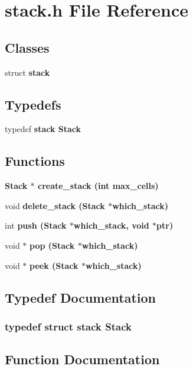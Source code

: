 \section{stack.h File Reference}
\label{stack_8h}
\subsection*{Classes}
\begin{CompactItemize}
\item 
struct \bf{stack}
\end{CompactItemize}
\subsection*{Typedefs}
\begin{CompactItemize}
\item 
typedef \bf{stack} \bf{Stack}
\end{CompactItemize}
\subsection*{Functions}
\begin{CompactItemize}
\item 
\bf{Stack} $\ast$ \bf{create\_\-stack} (int max\_\-cells)
\item 
void \bf{delete\_\-stack} (\bf{Stack} $\ast$which\_\-stack)
\item 
int \bf{push} (\bf{Stack} $\ast$which\_\-stack, void $\ast$ptr)
\item 
void $\ast$ \bf{pop} (\bf{Stack} $\ast$which\_\-stack)
\item 
void $\ast$ \bf{peek} (\bf{Stack} $\ast$which\_\-stack)
\end{CompactItemize}


\subsection{Typedef Documentation}
\subsubsection{\setlength{\rightskip}{0pt plus 5cm}typedef struct \bf{stack} \bf{Stack}}\label{stack_8h_bdd1c92124c0c7ffa92b9a0a5300168a}




\subsection{Function Documentation}
